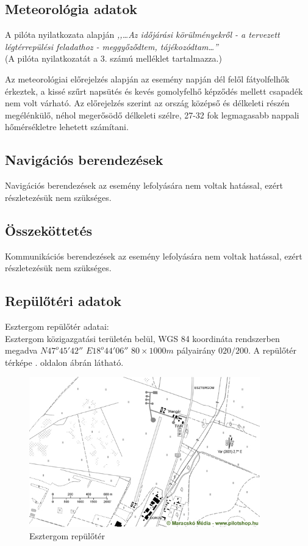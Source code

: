 \documentclass[a4paper,10pt]{article}
\begin{document}
\subsection{Meteorológia adatok}
A pilóta nyilatkozata alapján \textit{,,\dots Az időjárási körülményekről - a 
tervezett légtérrepülési feladathoz - meggyőződtem, tájékozódtam\dots ''}\\
(A pilóta nyilatkozatát a 3. számú melléklet tartalmazza.)

Az meteorológiai előrejelzés alapján az esemény napján dél felől
fátyolfelhők érkeztek, a kissé szűrt napsütés és kevés gomolyfelhő képződés 
mellett csapadék nem volt várható. Az előrejelzés szerint az ország középső
és délkeleti részén megélénkülő, néhol megerősödő délkeleti szélre, 27-32 
fok legmagasabb nappali hőmérsékletre lehetett számítani.

\subsection{Navigációs berendezések}
Navigációs berendezések az esemény lefolyására nem voltak hatással, ezért 
részletezésük nem szükséges.

\subsection{Összeköttetés}
Kommunikációs berendezések az esemény lefolyására nem voltak hatással, 
ezért részletezésük nem szükséges.

\subsection{Repülőtéri adatok}
Esztergom repülőtér adatai:\\
Esztergom közigazgatási területén belül, WGS 84 koordináta rendszerben megadva 
$N47^o 45' 42''$ $E18^o 44' 06''$ $80\times1000m$ pályairány $020/200$.
A repülőtér térképe . oldalon  ábrán látható.
\begin{figure}[ht!]
\centering
 \includegraphics[width=10cm]{kepek/LHEM}
 \caption{Esztergom repülőtér}\label{LHEM}
 
\end{figure}
\end{document}
